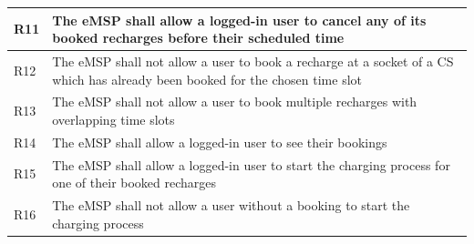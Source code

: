 \documentclass[11pt]{article}
\begin{document}
\begin{table}[H]
\begin{tabularx}{\textwidth}{|>{\centering\hsize=0.1\hsize}X|>{\hsize=1.9\hsize}X|}
        R11 & The eMSP shall allow a logged-in user to cancel any of its booked recharges before their scheduled time \\
        \hline
        R12 & The eMSP shall not allow a user to book a recharge at a socket of a CS which has already been booked for the chosen time slot \\
        \hline
        R13 & The eMSP shall not allow a user to book multiple recharges with overlapping time slots \\
        \hline
        R14 & The eMSP shall allow a logged-in user to see their bookings \\
        \hline
        R15 & The eMSP shall allow a logged-in user to start the charging process for one of their booked recharges \\
        \hline
        R16 & The eMSP shall not allow a user without a booking to start the charging process \\

\end{tabularx}
\end{table}
\end{document}
